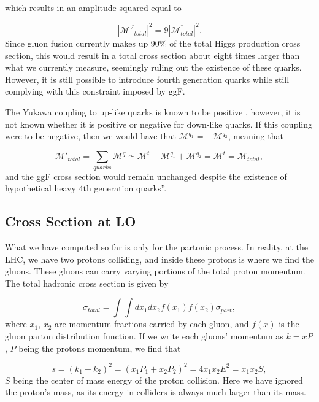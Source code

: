 \documentclass[EPJ,twocolumn]{webofc}
\begin{document}
which results in an amplitude squared equal to

\begin{equation}
     |\overline{\mathcal{M}´_{total}}|^2 =  9|\overline{\mathcal{M}_{total}}|^2.
\end{equation}
Since gluon fusion currently makes up 90\% of the total Higgs production cross section, this would result in a total cross section about eight times larger than what we currently measure, seemingly ruling out the existence of these quarks. However, it is still possible to introduce fourth generation quarks while still complying with this constraint imposed by ggF.

The Yukawa coupling to up-like quarks is known to be positive \cite{Cheung_2019} , however, it is not known whether it is positive or negative for down-like quarks. If this coupling were to be negative, then we would have that $\mathcal{M}^{q_1} = -\mathcal{M}^{q_2}$, meaning that 

\begin{equation}
    \mathcal{M}'_{total} =  \sum_{quarks} \mathcal{M}^q \simeq      \mathcal{M}^t+\mathcal{M}^{q_1}+\mathcal{M}^{q_2}= \mathcal{M}^t =    \mathcal{M}_{total},
\end{equation}
and the ggF cross section would remain unchanged despite the existence of hypothetical heavy 4th generation quarks”.

\subsection{Cross Section at LO}

What we have computed so far is only for the partonic process. In reality, at the LHC, we have two protons colliding, and inside these protons is where we find the gluons. These gluons can carry varying portions of the total proton momentum. The total hadronic cross section is given by

\begin{equation}
    \sigma_{total} = \int\int dx_1dx_2 f\left(x_1\right)f\left(x_2\right)\sigma_{part},
\end{equation}
where $x_1$, $x_2$ are momentum fractions carried by each gluon, and $f\left(x\right)$ is the gluon parton distribution function.  If we write each gluons' momentum as $k = xP$, $P$  being the protons momentum, we find that

\begin{equation}
    s = (k_1+k_2)^2 =(x_1P_1+x_2P_2)^2  = 4x_1x_2E^2 = x_1x_2S,
\end{equation}
$S$ being the center of mass energy of the proton collision. Here we have ignored the proton's mass, as its energy in colliders  is always much larger than its mass.
\end{document}
